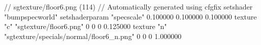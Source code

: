 // sgtexture/floor6.png (114)
// Automatically generated using cfgfix
setshader "bumpspecworld"
setshaderparam "specscale" 0.100000 0.100000 0.100000
texture "c" "sgtexture/floor6.png" 0 0 0 0.125000
texture "n" "sgtexture/specials/normal/floor6_n.png" 0 0 0 1.000000
